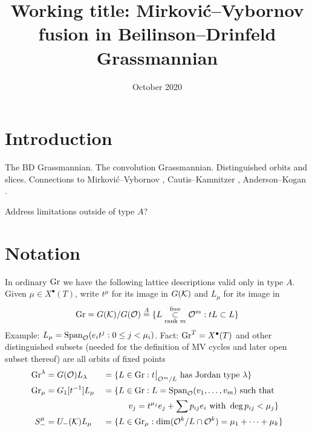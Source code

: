 \documentclass{article}
\title{Working title: Mirkovi\'c--Vybornov fusion in Beilinson--Drinfeld Grassmannian}
\date{October 2020}
\begin{document}
\maketitle

\section{Introduction}

The BD Grassmannian. The convolution Grassmannian. Distinguished orbits and slices. Connections to Mirkovi\'c--Vybornov \cite{mirkovic2007quiver,mirkovic2019comparison}, Cautis--Kamnitzer \cite{cautis2018categorical}, Anderson--Kogan \cite{anderson2005algebra}.

Address limitations outside of type $A$? 

\section{Notation}

In ordinary $\operatorname{Gr}$ we have the following lattice descriptions valid only in type \(A\).  
  Given \(\mu\in X^\bullet(T)\), write \(t^\mu\) for its image in \(G(\mathcal K)\) and 
  \(L_\mu\) for its image in 
  \[
    \operatorname{Gr} = G(\mathcal K)/G(\mathcal O)  \overset{A}{=}  \{L\overset{\text{free}}{\underset{\text{rank } m}{\subset}} \mathcal O^m : tL \subset L \}
  \]   %
% 
Example: \(L_\mu = \operatorname{Span}_{\mathcal O}(e_it^j : 0\le j <\mu_i)\).  
  Fact: \(\operatorname{Gr}^T = X^\bullet(T)\)  
  and other distinguished subsets (needed for the definition of MV cycles and later open subset thereof) are all orbits of fixed points  
  \[
    \begin{aligned}
  \operatorname{Gr}^\lambda &= G(\mathcal O) L_\lambda & & = \{L\in\operatorname{Gr} : t\big|_{\mathcal O^m/L} \text{ has Jordan type } \lambda\} \\
      \operatorname{Gr}_\mu & = G_1[t^{-1}] L_\mu & & = \{L\in \operatorname{Gr} : L = \operatorname{Span}_{\mathcal O}(v_1,\dots,v_m) \text{ such that } \\
        & & & \qquad\quad  v_j = t^{\mu_j} e_j + \sum p_{ij} e_i \text{ with  } \deg p_{ij} < \mu_j \} \\
  S^\mu_- &= U_-(\mathcal K) L_\mu & & = \{L\in \operatorname{Gr}_\mu : \dim (\mathcal O^k / L\cap \mathcal O^k) = \mu_1 + \dots + \mu_k \}
    \end{aligned}
  \] 
\end{document}
